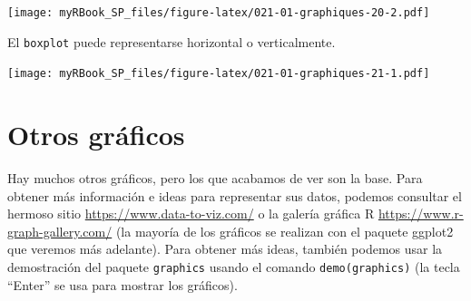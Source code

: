 \documentclass[
]{book}
\newenvironment{Shaded}{\begin{snugshade}}{\end{snugshade}}
\newcommand{\DataTypeTok}[1]{\textcolor[rgb]{0.13,0.29,0.53}{#1}}
\newcommand{\DecValTok}[1]{\textcolor[rgb]{0.00,0.00,0.81}{#1}}
\newcommand{\KeywordTok}[1]{\textcolor[rgb]{0.13,0.29,0.53}{\textbf{#1}}}
\newcommand{\NormalTok}[1]{#1}
\newcommand{\OperatorTok}[1]{\textcolor[rgb]{0.81,0.36,0.00}{\textbf{#1}}}
\newcommand{\OtherTok}[1]{\textcolor[rgb]{0.56,0.35,0.01}{#1}}
\newcommand{\StringTok}[1]{\textcolor[rgb]{0.31,0.60,0.02}{#1}}
\begin{document}
\texttt{[image: myRBook\_SP\_files/figure-latex/021-01-graphiques-20-2.pdf]}

El \texttt{boxplot} puede representarse horizontal o verticalmente.

\begin{Shaded}
\end{Shaded}

\texttt{[image: myRBook\_SP\_files/figure-latex/021-01-graphiques-21-1.pdf]}

\hypertarget{otros-gruxe1ficos}{%
\section{Otros gráficos}\label{otros-gruxe1ficos}}

Hay muchos otros gráficos, pero los que acabamos de ver son la base. Para obtener más información e ideas para representar sus datos, podemos consultar el hermoso sitio \url{https://www.data-to-viz.com/} o la galería gráfica R \url{https://www.r-graph-gallery.com/} (la mayoría de los gráficos se realizan con el paquete ggplot2 que veremos más adelante). Para obtener más ideas, también podemos usar la demostración del paquete \texttt{graphics} usando el comando \texttt{demo(\textquotesingle{}graphics\textquotesingle{})} (la tecla ``Enter'' se usa para mostrar los gráficos).
\end{document}
